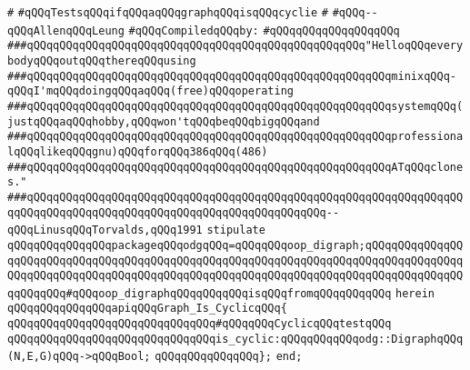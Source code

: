 \label{src/lib/graph/graph-is-cyclic.api}
\verb|#|\newline
\verb|#qQQqTestsqQQqifqQQqaqQQqgraphqQQqisqQQqcyclie|\newline
\verb|#|\newline
\verb|#qQQq--qQQqAllenqQQqLeung|\newline
\newline
\verb|#qQQqCompiledqQQqby:|\newline
\verb|#qQQqqQQqqQQqqQQqqQQq|\newline
\newline
\verb|###qQQqqQQqqQQqqQQqqQQqqQQqqQQqqQQqqQQqqQQqqQQqqQQqqQQq"HelloqQQqeverybodyqQQqoutqQQqthereqQQqusing|\newline
\verb|###qQQqqQQqqQQqqQQqqQQqqQQqqQQqqQQqqQQqqQQqqQQqqQQqqQQqqQQqminixqQQq-qQQqI'mqQQqdoingqQQqaqQQq(free)qQQqoperating|\newline
\verb|###qQQqqQQqqQQqqQQqqQQqqQQqqQQqqQQqqQQqqQQqqQQqqQQqqQQqqQQqsystemqQQq(justqQQqaqQQqhobby,qQQqwon'tqQQqbeqQQqbigqQQqand|\newline
\verb|###qQQqqQQqqQQqqQQqqQQqqQQqqQQqqQQqqQQqqQQqqQQqqQQqqQQqqQQqprofessionalqQQqlikeqQQqgnu)qQQqforqQQq386qQQq(486)|\newline
\verb|###qQQqqQQqqQQqqQQqqQQqqQQqqQQqqQQqqQQqqQQqqQQqqQQqqQQqqQQqATqQQqclones."|\newline
\verb|###qQQqqQQqqQQqqQQqqQQqqQQqqQQqqQQqqQQqqQQqqQQqqQQqqQQqqQQqqQQqqQQqqQQqqQQqqQQqqQQqqQQqqQQqqQQqqQQqqQQqqQQqqQQqqQQqqQQq--qQQqLinusqQQqTorvalds,qQQq1991|\newline
\newline
\newline
\newline
\verb|stipulate|\newline
\verb|qQQqqQQqqQQqqQQqpackageqQQqodgqQQq=qQQqqQQqoop_digraph;qQQqqQQqqQQqqQQqqQQqqQQqqQQqqQQqqQQqqQQqqQQqqQQqqQQqqQQqqQQqqQQqqQQqqQQqqQQqqQQqqQQqqQQqqQQqqQQqqQQqqQQqqQQqqQQqqQQqqQQqqQQqqQQqqQQqqQQqqQQqqQQqqQQqqQQqqQQqqQQqqQQq#qQQqoop_digraphqQQqqQQqqQQqisqQQqfromqQQqqQQqqQQq|\newline
\verb|herein|\newline
\newline
\verb|qQQqqQQqqQQqqQQqapiqQQqGraph_Is_CyclicqQQq{|\newline
\newline
\verb|qQQqqQQqqQQqqQQqqQQqqQQqqQQqqQQq#qQQqqQQqCyclicqQQqtestqQQq|\newline
\newline
\verb|qQQqqQQqqQQqqQQqqQQqqQQqqQQqqQQqis_cyclic:qQQqqQQqqQQqodg::DigraphqQQq(N,E,G)qQQq->qQQqBool;|\newline
\verb|qQQqqQQqqQQqqQQq};|\newline
\verb|end;|\newline

